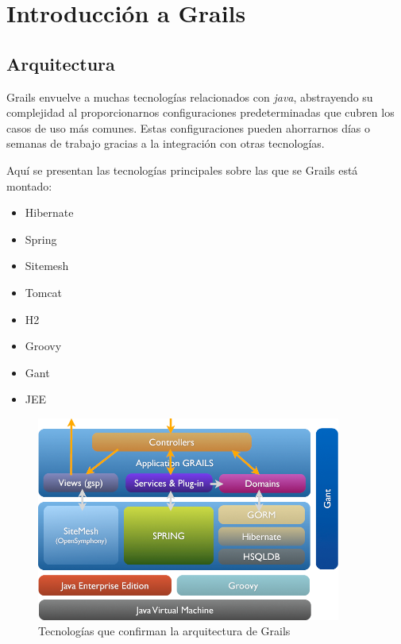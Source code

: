 \chapter{Introducci\'on a Grails}
\section{Arquitectura}
Grails envuelve a muchas tecnolog\'ias relacionados con \textit{java}, abstrayendo su complejidad al proporcionarnos configuraciones predeterminadas que cubren los casos de uso m\'as comunes. Estas configuraciones pueden ahorrarnos d\'ias o semanas de trabajo gracias a la integraci\'on con otras tecnolog\'ias.

Aqu\'i se presentan las tecnolog\'ias principales sobre las que se Grails est\'a montado:

\begin{multicols}{2}
\begin{itemize}
  \item Hibernate
  \item Spring
  \item Sitemesh
  \item Tomcat
  \item H2
  \item Groovy
  \item Gant
  \item JEE
\end{itemize}
\end{multicols}

\begin{figure}[ht!]

    \includegraphics[width=100mm]{img/arch}
    \caption{Tecnolog\'ias que confirman la arquitectura de Grails}
    \label{arquitectura}

\end{figure}



